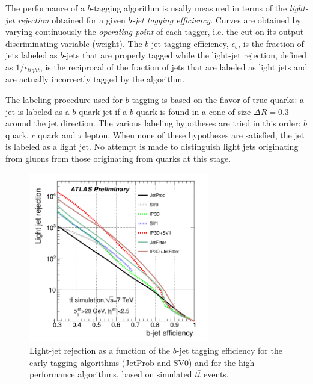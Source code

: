  The performance of a $b$-tagging algorithm is usally  measured in terms of the \emph{light-jet rejection} obtained for a given \emph{$b$-jet tagging efficiency}.  Curves are obtained by varying continuously the \emph{operating point} of each tagger, i.e. the cut on its output discriminating variable (weight).  The $b$-jet tagging efficiency,  $\epsilon_b$,  is the fraction of jets labeled as $b$-jets that are properly tagged while the light-jet rejection, defined as $1/\epsilon_{light}$, is the reciprocal of the fraction of jets that are labeled as light jets and are actually incorrectly tagged by the algorithm. 

The labeling procedure used for $b$-tagging is based on the flavor of true quarks: a jet is labeled as a $b$-quark jet if a $b$-quark is found in a cone of size $\Delta R = 0.3$ around the jet direction.  The various labeling hypotheses are tried in this order: $b$ quark, $c$ quark and $\tau$ lepton. When none of these hypotheses are satisfied, the jet
is labeled as a light jet. No attempt is made to distinguish light jets originating from gluons from those originating from quarks at this stage.

\begin{figure}[htbp]
  \begin{center}
      \includegraphics[width=0.7\textwidth]{btaggingperformance.png}
    \caption{Light-jet rejection as a function of the $b$-jet tagging efficiency for the early tagging algorithms (JetProb and SV0) and for the high-performance algorithms, based on simulated $t\bar{t}$ events. }
    \label{fig:btaggingperformance}
  \end{center}
\end{figure}

